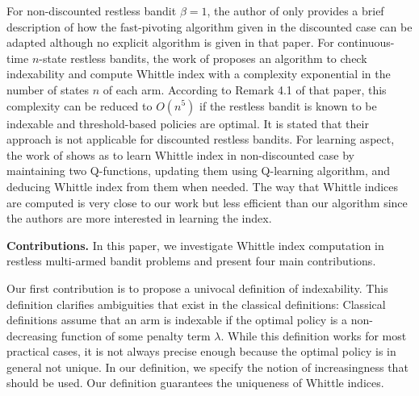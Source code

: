 For non-discounted restless bandit $\beta=1$,  the author of \cite{nino2020fast} only provides a brief description of how the fast-pivoting algorithm given in the discounted case can be adapted although no explicit algorithm is given in that paper. For continuous-time $n$-state restless bandits, the work of \cite{ayesta2021computation} proposes an algorithm to check indexability and compute Whittle index with a complexity exponential in the number of states $n$ of each arm. According to Remark 4.1 of that paper, this complexity can be reduced to $O(n^5)$ if the restless bandit is known to be indexable and threshold-based policies are optimal. It is stated that their approach is not applicable for discounted restless bandits.
For learning aspect, the work of \cite{gibson2021novel} shows as to learn Whittle index in non-discounted case by maintaining two Q-functions, updating them using Q-learning algorithm, and deducing Whittle index from them when needed. The way that Whittle indices are computed is very close to our work but less efficient than our algorithm since the authors are more interested in learning the index. 

\textbf{Contributions.} In this paper, we investigate Whittle index computation in restless multi-armed bandit problems and present four main contributions. 

Our first contribution is to propose a univocal definition of indexability. This definition clarifies ambiguities that exist in the classical definitions: Classical definitions assume that an arm is indexable if the optimal policy is a non-decreasing function of some penalty term $\lambda$. While this definition works for most practical cases, it is not always precise enough because the optimal policy is in general not unique. In our definition, we specify the notion of increasingness that should be used. Our definition guarantees the uniqueness of Whittle indices.

